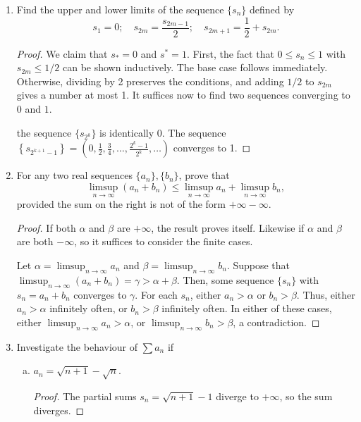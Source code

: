 \documentclass{scrbook}
\renewcommand{\to}{\rightarrow}
\begin{document}
\begin{enumerate}
\item %
Find the upper and lower limits of the sequence $\{s_n\}$ defined by
\[
	s_1 = 0; \quad s_{2m} = \frac{s_{2m-1}}{2}; \quad s_{2m+1} = \frac{1}{2} + s_{2m}.
\]

\begin{proof}
We claim that $s_* = 0$ and $s^* = 1$. First, the fact that $0 \le s_n \le 1$ with $s_{2m} \le 1/2$ can be shown inductively. The base case follows immediately. Otherwise, dividing by 2 preserves the conditions, and adding $1/2$ to $s_{2m}$ gives a number at most 1. It suffices now to find two sequences converging to $0$ and $1$.

the sequence $\{s_{2^k}\}$ is identically $0$. The sequence $\left\lbrace s_{2^{k+1} - 1}\right\rbrace = \left(0, \frac{1}{2}, \frac{3}{4}, \dotsc, \frac{2^k - 1}{2^k}, \dotsc\right)$ converges to 1. 
\end{proof}

\item %
For any two real sequences $\{a_n\}, \{b_n\}$, prove that
\[
	\limsup_{n \to \infty} (a_n + b_n) \le \limsup_{n \to \infty} a_n + \limsup_{n \to \infty} b_n,
\]
provided the sum on the right is not of the form $+\infty - \infty$.

\begin{proof}
If both $\alpha$ and $\beta$ are $+\infty$, the result proves itself. Likewise if $\alpha$ and $\beta$ are both $-\infty$, so it suffices to consider the finite cases.

Let $\alpha = \limsup_{n \to \infty} a_n$ and $\beta = \limsup_{n \to \infty} b_n$. Suppose that $\limsup_{n \to \infty} (a_n + b_n) = \gamma > \alpha + \beta$. Then, some sequence $\{s_n\}$ with $s_n = a_n + b_n$ converges to $\gamma$. For each $s_n$, either $a_n > \alpha$ or $b_n > \beta$. Thus, either $a_n > \alpha$ infinitely often, or $b_n > \beta$ infinitely often. In either of these cases, either $\limsup_{n \to \infty} a_n > \alpha$, or $\limsup_{n \to \infty} b_n > \beta$, a contradiction.
\end{proof}

\item %
Investigate the behaviour of $\sum a_n$ if
\begin{enumerate}[(a)]
\item $a_n = \sqrt{n + 1} - \sqrt{n}$.

\begin{proof}
The partial sums $s_n = \sqrt{n + 1} - 1$ diverge to $+\infty$, so the sum diverges.
\end{proof}


\end{enumerate}
\end{enumerate}
\end{document}
